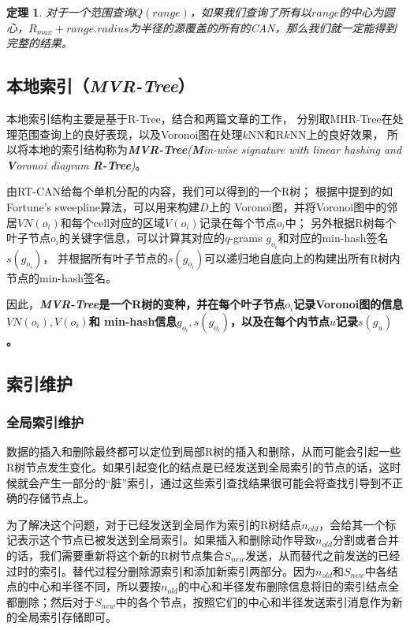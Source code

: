 \documentclass{ML}
\newtheorem{theorem}{\hspace{2em}定理}
\begin{document}
\begin{theorem}\label{theorem:RT-CAN-2}
  对于一个范围查询$Q(range)$，如果我们查询了所有以$range$的中心为圆心，$R_{max}+range.radius$为半径的源覆盖的所有的CAN，那么我们就一定能得到完整的结果。
\end{theorem}

\subsection{本地索引（\textit{MVR-Tree}）}
本地索引结构主要是基于R-Tree\cite{R-Tree}，结合\cite{MHR-Tree}和\cite{VoR-Tree}两篇文章的工作，
分别取MHR-Tree在处理范围查询上的良好表现，以及Voronoi图在处理$k$NN和R$k$NN上的良好效果，
所以将本地的索引结构称为\textit{\textbf{MVR-Tree}(\textbf{M}in-wise signature with linear hashing and \textbf{V}oronoi diagram \textbf{R-Tree})}。

由RT-CAN给每个单机分配的内容，我们可以得到的一个R树；%
根据\cite{VD-Property}中提到的如Fortune's sweepline算法，可以用来构建$D$上的
Voronoi图，并将Voronoi图中的邻居$VN(o_i)$和每个cell对应的区域$V(o_i)$记录在每个节点$o_i$中；
另外根据R树每个叶子节点$o_i$的关键字信息，可以计算其对应的$q$-grams $g_{o_i}$和对应的min-hash签名$s(g_{o_i})$，
并根据所有叶子节点的$s(g_{o_i})$可以递归地自底向上的构建出所有R树内节点的min-hash签名\cite{MHR-Tree}。

因此，\textbf{\textit{MVR-Tree}是一个R树的变种，并在每个叶子节点$o_i$记录Voronoi图的信息$VN(o_i), V(o_i)$和
min-hash信息$g_{o_i}, s(g_{o_i})$，以及在每个内节点$u$记录$s(g_u)$。}

\subsection{索引维护}\label{sec:maintain-index}
\subsubsection{全局索引维护}
数据的插入和删除最终都可以定位到局部R树的插入和删除，从而可能会引起一些R树节点发生变化。如果引起变化的结点是已经发送到全局索引的节点的话，这时候就会产生一部分的“脏”索引，通过这些索引查找结果很可能会将查找引导到不正确的存储节点上。

为了解决这个问题，对于已经发送到全局作为索引的R树结点$n_{old}$，会给其一个标记表示这个节点已被发送到全局索引。如果插入和删除动作导致$n_{old}$分割或者合并的话，我们需要重新将这个新的R树节点集合$S_{new}$发送，从而替代之前发送的已经
过时的索引。替代过程分删除源索引和添加新索引两部分。因为$n_{old}$和$S_{new}$中各结点的中心和半径不同，所以要按$n_{old}$的中心和半径发布删除信息将旧的索引结点全都删除；然后对于$S_{new}$中的各个节点，按照它们的中心和半径发送索引消息作为新的全局索引存储即可。
\end{document}

